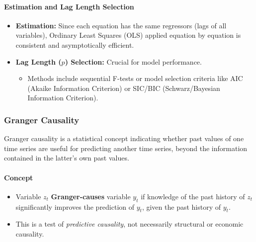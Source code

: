 \documentclass[a4paper, 10pt]{article}
\theoremstyle{definition}	%
\begin{document}
\paragraph{Estimation and Lag Length Selection}
\begin{itemize}
    \item \textbf{Estimation:} Since each equation has the same regressors (lags of all variables), Ordinary Least Squares (OLS) applied equation by equation is consistent and asymptotically efficient.
    \item \textbf{Lag Length (\(p\)) Selection:} Crucial for model performance.
    \begin{itemize}
        \item Methods include sequential F-tests or model selection criteria like AIC (Akaike Information Criterion) or SIC/BIC (Schwarz/Bayesian Information Criterion).
    \end{itemize}
\end{itemize}

\subsubsection{Granger Causality}
Granger causality is a statistical concept indicating whether past values of one time series are useful for predicting another time series, beyond the information contained in the latter's own past values.

\paragraph{Concept}
\begin{itemize}
    \item Variable \(z_t\) \textbf{Granger-causes} variable \(y_t\) if knowledge of the past history of \(z_t\) significantly improves the prediction of \(y_t\), given the past history of \(y_t\).
    \item This is a test of \textit{predictive causality}, not necessarily structural or economic causality.
\end{itemize}
\end{document}

